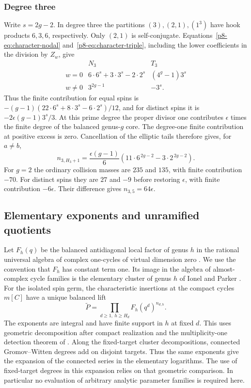 \subsubsection{Degree three}
Write $s=2g-2$. In degree three the partitions $(3),(2,1),(1^3)$
have hook products $6,3,6$, respectively. Only $(2,1)$ is
self-conjugate. Equations~\eqref{p8-eq:character-nodal}
and~\eqref{p8-eq:character-triple}, including the lower coefficients in
the division by $Z_w$, give
\[
\begin{array}{c|cc}
 &N_3&T_3\\ \hline
 w=0   &6\cdot6^s+3\cdot3^s-2\cdot2^s &(4^g-1)3^s\\
 w\ne0 &3^{2g-1}&-3^s .
\end{array}
\]
Thus the finite contribution for equal spins is
$-(g-1)(22\cdot6^s+8\cdot3^s-6\cdot2^s)/12$, and for distinct
spins it is $-2\epsilon(g-1)3^s/3$. At this prime degree the
proper divisor one contributes $\epsilon$ times the finite degree
of the balanced genus-$g$ core. The degree-one finite contribution
at positive excess is zero. Cancellation of the elliptic tails
therefore gives, for $a\ne b$,
\begin{equation}
        n_{3,H_3+1}
       =\frac{\epsilon(g-1)}{6}
          \left(11\cdot6^{\,2g-2}-3\cdot2^{\,2g-2}\right).
 \label{p8-eq:cubic}
\end{equation}
For $g=2$ the ordinary collision masses are $235$ and $135$,
with finite contribution $-70$. For distinct spins they are $27$
and $-9$ before restoring $\epsilon$, with finite contribution
$-6\epsilon$. Their difference gives $n_{3,5}=64\epsilon$.
\subsection{Elementary exponents and unramified quotients}\label{p8-sec:exponents}

Let $F_h(q)$ be the balanced antidiagonal local factor of genus $h$ in
the rational universal algebra of complex one-cycles of virtual dimension
zero \cite{pardon,WueProduct}. We use the convention that $F_h$ has
constant term one. Its image in the algebra of almost-complex cycle
families is the elementary cluster of genus $h$ of Ionel and
Parker \cite{ip,WueProduct}. For the isolated spin germ, the characteristic
insertions at the compact cycles $m[C]$ have a unique balanced lift
\cite[Proposition~3.1]{WueUnramified}
\begin{equation}\label{p8-eq:lifted-product}
  \widetilde P=\prod_{d\ge1,\ h\ge H_d}F_h(q^d)^{n_{d,h}}.
\end{equation}
The exponents are integral and have finite support in $h$ at fixed
$d$. This uses geometric decomposition after compact realization and
the multiplicity-one detection theorem of \cite{WueProduct}. Along the
fixed-target cluster decompositions, connected Gromov--Witten degrees
add on disjoint targets. Thus the same exponents give the expansion
of the connected series in the elementary logarithms. The use of
fixed-target degrees in this expansion relies on that geometric
comparison. In particular no evaluation of arbitrary analytic
parameter families is required here.

